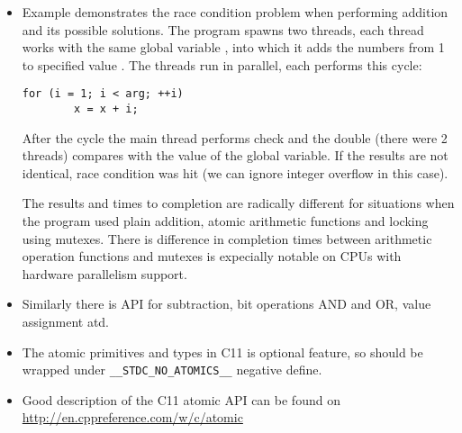 \begin{itemize}
\item \label{ATOMIC_ADD} Example  demonstrates
the race condition problem when performing addition and its possible solutions.
The program spawns two threads, each thread works with the same global variable
, into which it adds the numbers from 1 to specified value .
The threads run in parallel, each performs this cycle:

\begin{verbatim}
for (i = 1; i < arg; ++i)
        x = x + i;
\end{verbatim}

After the cycle the main thread performs check and the double (there were
2 threads) compares with the value of the  global variable.
If the results are not identical, race condition was hit (we can ignore
integer overflow in this case).
\par
The results and times to completion are radically different for situations
when the program used plain addition, atomic arithmetic functions and locking
using mutexes. There is difference in completion times between 
arithmetic operation functions and mutexes is expecially notable on
CPUs with hardware parallelism support.
\item Similarly there is API for subtraction, bit operations
AND and OR, value assignment atd.
\item The atomic primitives and types in C11 is optional feature, so should
be wrapped under \texttt{\_\_STDC\_NO\_ATOMICS\_\_} negative define.
\item Good description of the C11 atomic API can be found on
\url{http://en.cppreference.com/w/c/atomic}
\end{itemize}




